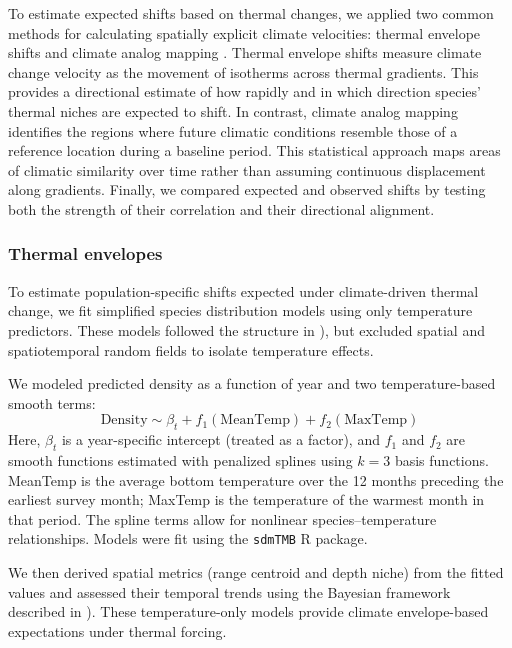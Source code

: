 \documentclass[11pt]{article}
\begin{document}
\begin{spacing}{1.5}
To estimate expected shifts based on thermal changes, we applied two common methods for calculating spatially explicit climate velocities: thermal envelope shifts \citep{pinsky_marine_2013} and climate analog mapping \citep{fitzpatrick_contemporary_2019}. Thermal envelope shifts measure climate change velocity as the movement of isotherms across thermal gradients. This provides a directional estimate of how rapidly and in which direction species' thermal niches are expected to shift. In contrast, climate analog mapping identifies the regions where future climatic conditions resemble those of a reference location during a baseline period. This statistical approach maps areas of climatic similarity over time rather than assuming continuous displacement along gradients. Finally, we compared expected and observed shifts by testing both the strength of their correlation and their directional alignment.

\subsubsection{Thermal envelopes}

To estimate population-specific shifts expected under climate-driven thermal change, we fit simplified species distribution models using only temperature predictors. These models followed the structure in \textit{}), but excluded spatial and spatiotemporal random fields to isolate temperature effects.

We modeled predicted density as a function of year and two temperature-based smooth terms:
\begin{equation}
\text{Density} \sim \beta_t + f_1(\text{MeanTemp}) + f_2(\text{MaxTemp})
\label{eq:8}
\end{equation}
Here, $\beta_t$ is a year-specific intercept (treated as a factor), and $f_1$ and $f_2$ are smooth functions estimated with penalized splines using $k = 3$ basis functions. MeanTemp is the average bottom temperature over the 12 months preceding the earliest survey month; MaxTemp is the temperature of the warmest month in that period. The spline terms allow for nonlinear species–temperature relationships. Models were fit using the \texttt{sdmTMB} R package.

We then derived spatial metrics (range centroid and depth niche) from the fitted values and assessed their temporal trends using the Bayesian framework described in \textit{}). These temperature-only models provide climate envelope-based expectations under thermal forcing.


\end{spacing}
\end{document}
